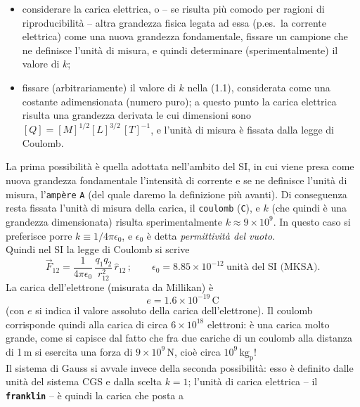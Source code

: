 \begin{itemize}
  \item[i)] considerare la carica elettrica, o -- se risulta pi\`u comodo per
    ragioni di riproducibilit\`a -- altra grandezza fisica legata ad essa
    (p.es.\ la corrente elettrica) come una nuova grandezza fondamentale,
    fissare un campione che ne definisce l'unit\`a di misura, e quindi
    determinare (sperimentalmente) il valore di $k$;
  \item[ii)] fissare (arbitrariamente) il valore di $k$ nella (1.1), considerata
    come una costante adimensionata (numero puro); a questo punto la carica
    elettrica risulta una grandezza derivata le cui dimensioni sono
    $[Q]=[M]^{1/2}[L]^{3/2}\,[T]^{-1}$, e l'unit\`a di misura \`e fissata dalla
    legge di Coulomb.
\end{itemize}
La prima possibilit\`a \`e quella adottata nell'ambito del SI, in cui viene
presa come nuova grandezza fondamentale l'intensit\`a di corrente e se ne
definisce l'unit\`a di misura, l'\texttt{amp\`ere} \texttt{A} (del quale daremo
la definizione pi\`u avanti). Di conseguenza resta fissata l'unit\`a di misura
della carica, il \texttt{coulomb} (\texttt{C}), e $k$ (che quindi \`e una
grandezza dimensionata) risulta sperimentalmente $k\approx9\times10^9$. In
questo caso si preferisce porre $k\equiv1/4\pi\epsilon_0$, e $\epsilon_0$ \`e
detta \emph{permittivit\`a del vuoto}.\\
Quindi nel SI la legge di Coulomb si scrive
\begin{equation}
  \vec F_{12}=\frac{1}{4\pi\epsilon_0}\,\frac{q_1q_2}{r_{12}^2}\,\hat r_{12}\,;
  \qquad
  \epsilon_0=8.85\times10^{-12}\ \text{unit\`a del SI (MKSA)}.
  \tag{1.1'}
\end{equation}
La carica dell'elettrone (misurata da Millikan) \`e
\begin{equation}
  e=1.6\times10^{-19}\,\mathrm{C}
  \tag{1.2}
\end{equation}
(con $e$ si indica il valore assoluto della carica dell'elettrone). Il coulomb
corrisponde quindi alla carica di circa $6\times10^{18}$ elettroni: \`e una
carica molto grande, come si capisce dal fatto che fra due cariche di un coulomb
alla distanza di 1\,m si esercita una forza di $9\times10^9$\,N, cio\`e circa
$10^9\,\mathrm{kg_p}$!\\
Il sistema di Gauss si avvale invece della seconda possibilit\`a: esso \`e
definito dalle unit\`a del sistema CGS e dalla scelta $k=1$; l'unit\`a di carica
elettrica -- il \texttt{\textbf{franklin}} -- \`e quindi la carica che posta a
